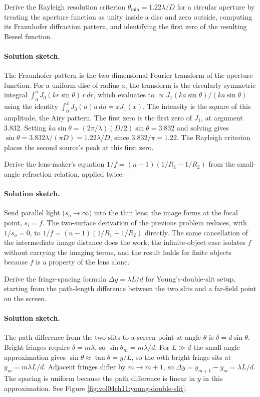 \begin{exercise}
Derive the Rayleigh resolution criterion $\theta_{\min} = 1.22\lambda
/D$ for a circular aperture by treating the aperture function as
unity inside a disc and zero outside, computing its Fraunhofer
diffraction pattern, and identifying the first zero of the resulting
Bessel function.
\paragraph{Solution sketch.} The Fraunhofer pattern is the
two-dimensional Fourier transform of the aperture function. For a
uniform disc of radius $a$, the transform is the circularly symmetric
integral $\int_{0}^{a} J_{0}(kr\sin\theta)\,r\,dr$, which evaluates to
$\propto J_{1}(ka\sin\theta)/(ka\sin\theta)$ using the identity
$\int_{0}^{x} J_{0}(u)u\,du = x J_{1}(x)$. The intensity is the square
of this amplitude, the Airy pattern. The first zero is the first zero of
$J_{1}$, at argument $3.832$. Setting
$ka\sin\theta = (2\pi/\lambda)(D/2)\sin\theta = 3.832$ and solving gives
$\sin\theta = 3.832\lambda/(\pi D) = 1.22\lambda/D$, since
$3.832/\pi = 1.22$. The Rayleigh criterion places the second source's
peak at this first zero.
\end{exercise}

\begin{exercise}
Derive the lens-maker's equation $1/f = (n-1)(1/R_{1} - 1/R_{2})$
from the small-angle refraction relation, applied twice.
\paragraph{Solution sketch.} Send parallel light ($s_{o} \to \infty$)
into the thin lens; the image forms at the focal point, $s_{i} = f$. The
two-surface derivation of the previous problem reduces, with
$1/s_{o} = 0$, to $1/f = (n-1)(1/R_{1} - 1/R_{2})$ directly. The same
cancellation of the intermediate image distance does the work; the
infinite-object case isolates $f$ without carrying the imaging terms,
and the result holds for finite objects because $f$ is a property of the
lens alone.
\end{exercise}

\begin{exercise}
Derive the fringe-spacing formula $\Delta y = \lambda L/d$ for
Young's-double-slit setup, starting from the path-length difference
between the two slits and a far-field point on the screen.
\paragraph{Solution sketch.} The path difference from the two slits to a
screen point at angle $\theta$ is $\delta = d\sin\theta$. Bright fringes
require $\delta = m\lambda$, so $\sin\theta_{m} = m\lambda/d$. For
$L \gg d$ the small-angle approximation gives
$\sin\theta \approx \tan\theta = y/L$, so the $m$th bright fringe sits
at $y_{m} = m\lambda L/d$. Adjacent fringes differ by $m \to m+1$, so
$\Delta y = y_{m+1} - y_{m} = \lambda L/d$. The spacing is uniform
because the path difference is linear in $y$ in this approximation. See
Figure \ref{fig:vol04ch11:young-double-slit}.
\end{exercise}


